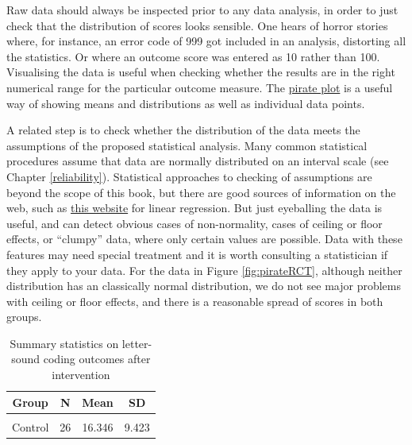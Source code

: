 \documentclass{krantz}
\begin{document}
Raw data should always be inspected prior to any data analysis, in order to just check that the distribution of scores looks sensible. One hears of horror stories where, for instance, an error code of 999 got included in an analysis, distorting all the statistics. Or where an outcome score was entered as 10 rather than 100. Visualising the data is useful when checking whether the results are in the right numerical range for the particular outcome measure. The \href{https://www.psychologicalscience.org/observer/yarrr-the-pirates-guide-to-r}{pirate plot} is a useful way of showing means and distributions as well as individual data points.

A related step is to check whether the distribution of the data meets the assumptions of the proposed statistical analysis. Many common statistical procedures assume that data are normally distributed on an interval scale (see Chapter \ref{reliability}). Statistical approaches to checking of assumptions are beyond the scope of this book, but there are good sources of information on the web, such as \href{http://www.sthda.com/english/articles/39-regression-model-diagnostics/161-linear-regression-assumptions-and-diagnostics-in-r-essentials/}{this website} for linear regression. But just eyeballing the data is useful, and can detect obvious cases of non-normality, cases of ceiling or floor effects, or ``clumpy'' data, where only certain values are possible. Data with these features may need special treatment and it is worth consulting a statistician if they apply to your data. For the data in Figure \ref{fig:pirateRCT}, although neither distribution has an classically normal distribution, we do not see major problems with ceiling or floor effects, and there is a reasonable spread of scores in both groups.

\begin{table}

\caption{\label{tab:table2gp}Summary statistics on letter-sound coding outcomes after intervention}
\centering
\begin{tabular}[t]{cccc}
\toprule
Group & N & Mean & SD\\
\midrule
\cellcolor{gray!6}{Intervention} & \cellcolor{gray!6}{28} & \cellcolor{gray!6}{22.286} & \cellcolor{gray!6}{7.282}\\
Control & 26 & 16.346 & 9.423\\
\bottomrule
\end{tabular}
\end{table}
\end{document}
